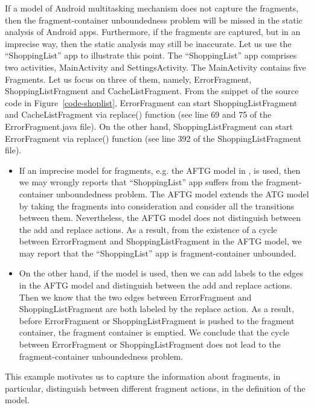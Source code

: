 %
If a model of Android multitasking mechanism does not capture the fragments, then the fragment-container unboundedness problem will be missed in the static analysis of Android apps. 
Furthermore, if the fragments are captured, but in an imprecise way, then the static analysis may still be inaccurate. Let us use the ``ShoppingList'' app to illustrate this point. 
The ``ShoppingList'' app comprises two activities, MainActivity and SettingsActivity. The MainActivity contains five Fragments. Let us focus on three of them, namely, ErrorFragment, ShoppingListFragment and CacheListFragment. From the snippet of the source code in Figure~\ref{code-shoplist}, ErrorFragment can start ShoppingListFragment and CacheListFragment via replace() function (see line 69 and 75 of the ErrorFragment.java file). On the other hand, ShoppingListFragment can start ErrorFragment via replace() function (see line 392 of the ShoppingListFragment file). 
%
\begin{itemize}
\item If an imprecise model for fragments, e.g. the AFTG model in \cite{CHGD18}, is used, then we may wrongly reports that ``ShoppingList'' app suffers from the fragment-container unboundedness problem. The AFTG model extends the ATG model by taking the fragments into consideration and consider all the transitions between them. Nevertheless, the AFTG model does not distinguish between the add and replace actions. As a result, from the existence of a cycle between ErrorFragment and ShoppingListFragment in the AFTG model, we may report that the ``ShoppingList'' app is fragment-container unbounded. 
%
\item On the other hand, if the {\AMASS} model is used, then we can add labels to the edges in the AFTG model and distinguish between the add and replace actions. Then we know that the two edges between ErrorFragment and ShoppingListFragment are both labeled by the replace action. As a result, before ErrorFragment or ShoppingListFragment is pushed to the fragment container, the fragment container is emptied. We conclude that the cycle between ErrorFragment or ShoppingListFragment does not lead to the fragment-container unboundedness problem. 
\end{itemize}
This example motivates us to capture the information about fragments, in particular, distinguish between different fragment actions, in the definition of the {\AMASS} model.

